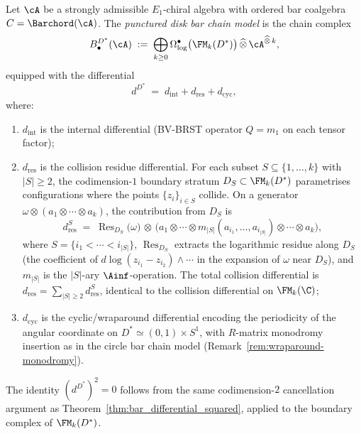 \begin{definition}%
\label{def:punctured-disk-bar}%
%
%
Let $\cA$ be a strongly admissible $E_1$-chiral algebra
with ordered bar coalgebra $C=\Barchord(\cA)$.
The \emph{punctured disk bar chain model} is the
chain complex
\begin{equation}\label{eq:punctured-disk-bar}
B^{D^*}_\bullet(\cA)
\;:=\;
\bigoplus_{k\ge 0}
\Omega^\bullet_{\log}\bigl(\FM_k(D^*)\bigr)
\,\widehat\otimes\,
\cA^{\widehat\otimes\,k},
\end{equation}
equipped with the differential
\begin{equation}\label{eq:punctured-disk-diff}
d^{D^*}
\;=\;
d_{\mathrm{int}} + d_{\mathrm{res}} + d_{\mathrm{cyc}},
\end{equation}
where:
\begin{enumerate}[label=\textup{(\roman*)}]
\item $d_{\mathrm{int}}$ is the internal differential
 (BV-BRST operator $Q=m_1$ on each tensor factor);
\item $d_{\mathrm{res}}$ is the collision residue
 differential. For each subset $S\subseteq\{1,\ldots,k\}$
 with $|S|\ge 2$, the codimension-$1$ boundary stratum
 $D_S\subset\FM_k(D^*)$ parametrises configurations where
 the points $\{z_i\}_{i\in S}$ collide. On a generator
 $\omega\otimes(a_1\otimes\cdots\otimes a_k)$, the
 contribution from $D_S$ is
 \[
 d_{\mathrm{res}}^S
 \;=\;
 \operatorname{Res}_{D_S}\!\bigl(\omega\bigr)
 \,\otimes\,
 \bigl(a_1\otimes\cdots\otimes
 m_{|S|}(a_{i_1},\ldots,a_{i_{|S|}})
 \otimes\cdots\otimes a_k\bigr),
 \]
 where $S=\{i_1<\cdots<i_{|S|}\}$,
 $\operatorname{Res}_{D_S}$ extracts the logarithmic
 residue along $D_S$ (the coefficient of
 $d\log(z_{i_1}-z_{i_2})\wedge\cdots$ in the
 expansion of $\omega$ near $D_S$), and
 $m_{|S|}$ is the $|S|$-ary $\Ainf$-operation.
 The total collision differential is
 $d_{\mathrm{res}}=\sum_{|S|\ge 2}d_{\mathrm{res}}^S$,
 identical to the collision differential on $\FM_k(\C)$;
\item $d_{\mathrm{cyc}}$ is the cyclic/wraparound
 differential encoding the periodicity of the
 angular coordinate on $D^*\simeq(0,1)\times S^1$,
 with $R$-matrix monodromy insertion as in the
 circle bar chain model
 \textup{(}Remark~\textup{\ref{rem:wraparound-monodromy}}\textup{)}.
\end{enumerate}
The identity $(d^{D^*})^2=0$ follows from the same
codimension-$2$ cancellation argument as
Theorem~\textup{\ref{thm:bar_differential_squared}},
applied to the boundary complex of $\FM_k(D^*)$.
\end{definition}

